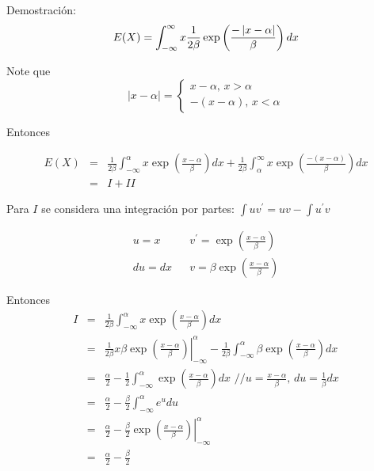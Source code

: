\begin{i}
Demostración: 
\begin{equation*}
E(X)=\int_{-\infty }^{\infty }x\frac{1}{2\beta }\exp \left( \frac{%
-\left\vert x-\alpha \right\vert }{\beta }\right)dx
\end{equation*}

Note que 
\begin{equation*}
\left\vert x-\alpha \right\vert =\left\{ 
\begin{array}{c}
x-\alpha \text{, }x>\alpha \\ 
-(x-\alpha )\text{, }x<\alpha%
\end{array}%
\right.
\end{equation*}

Entonces

\begin{eqnarray*}
E(X) &=&\frac{1}{2\beta }\int_{-\infty }^{\alpha }x\exp \left( \frac{
x-\alpha }{\beta }\right) dx+\frac{1}{2\beta }\int_{\alpha }^{\infty }x\exp
\left( \frac{-(x-\alpha )}{\beta }\right) dx \\
&=&I+II
\end{eqnarray*}

\bigskip

Para $I$ se considera una integraci\'{o}n por partes: $\int uv^{\prime}=uv-\int u^{\prime }v$

\begin{equation*}
\begin{array}{ccc}
u=x &  & v^{\prime }=\exp \left( \frac{x-\alpha }{\beta }\right) \\ 
du=dx &  & v=\beta \exp \left( \frac{x-\alpha }{\beta }\right)%
\end{array}%
\end{equation*}

\bigskip

Entonces 
\begin{eqnarray*}
I &=&\frac{1}{2\beta }\int_{-\infty }^{\alpha }x\exp \left( \frac{x-\alpha }{
\beta }\right) dx \\
&=&\left. \frac{1}{2\beta }x\beta \exp \left( \frac{x-\alpha }{\beta }
\right) \right\vert _{-\infty }^{\alpha }-\frac{1}{2\beta }\int_{-\infty
}^{\alpha }\beta \exp \left( \frac{x-\alpha }{\beta }\right) dx \\
&=&\frac{\alpha }{2}-\frac{1}{2}\int_{-\infty }^{\alpha }\exp \left( \frac{
x-\alpha }{\beta }\right) dx\text{ \ //}u=\frac{x-\alpha }{\beta }\text{, \ }
du=\frac{1}{\beta }dx \\
&=&\frac{\alpha }{2}-\frac{\beta }{2}\int_{-\infty }^{\alpha }e^{u}du \\
&=&\frac{\alpha }{2}-\left. \frac{\beta }{2}\exp \left( \frac{x-\alpha }{
\beta }\right) \right\vert _{-\infty }^{\alpha } \\
&=&\frac{\alpha }{2}-\frac{\beta }{2}
\end{eqnarray*}



\end{i}
